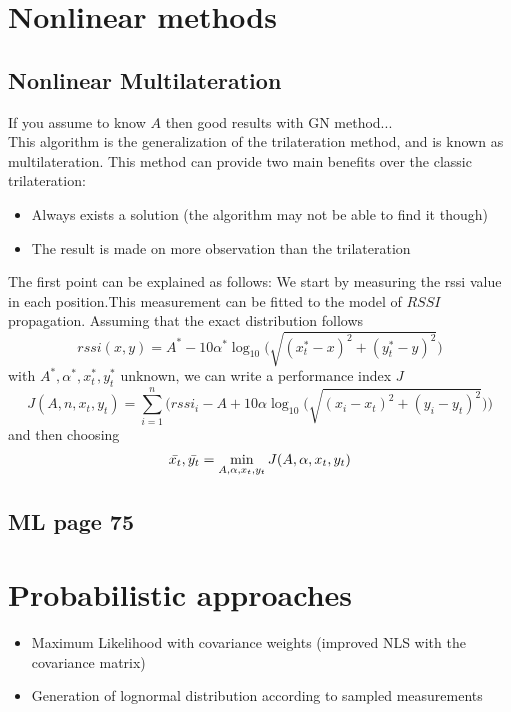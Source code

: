\documentclass[12pt]{report}
\begin{document}
\section{Nonlinear methods}
\subsection{Nonlinear Multilateration}
If you assume to know $A$ then good results with GN method...\\
This algorithm is the generalization of the trilateration method, and is known as multilateration. 
This method can provide two main benefits over the classic trilateration:
\begin{itemize}
    \item Always exists a solution (the algorithm may not be able to find it though)
    \item The result is made on more observation than the trilateration
\end{itemize}
The first point can be explained as follows:
We start by measuring the rssi value in each position.This measurement can be fitted to the model of $RSSI$ propagation. Assuming that the exact distribution follows 
\begin{equation}
rssi(x,y)=A^*-10\alpha^*\log_{10}\big(\sqrt{(x_t^*-x)^2+(y_t^*-y)^2}\big)    
\end{equation}
with $A^*,\alpha^*,x^*_t,y^*_t$ unknown, we can write a performance index $J$
\begin{equation}
    J(A,n,x_t,y_t)=\sum_{i=1}^n\bigg(rssi_i-A+10\alpha\log_{10}\big(\sqrt{(x_i-x_t)^2+(y_i-y_t)^2}\big)\bigg)
\end{equation}
and then choosing 
\begin{equation}
\Bar{x_t}, \Bar{y_t}=\min_{A,\alpha,x_t,y_t}J(A,\alpha,x_t,y_t)
\end{equation}
\clearpage

\subsection{ML page 75}


\clearpage

\section{Probabilistic approaches}
\begin{itemize}
    \item Maximum Likelihood with covariance weights (improved NLS with the covariance matrix)
    \item Generation of lognormal distribution according to sampled measurements
\end{itemize}
\clearpage
\end{document}
